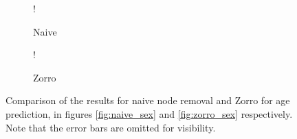 \begin{figure}[H]
    \centering
        \begin{subfigure}{.5\textwidth}
            \centering
            \begin{center}
                \resizebox {1.0\linewidth} {!} {
                    
                }
            \end{center}
            \caption{Naive}
            \label{fig:comparison_age_naive}
        \end{subfigure}%
        \begin{subfigure}{.5\textwidth}
            \centering
            \begin{center}
                \resizebox {1.0\linewidth} {!} {
                    
                }
            \end{center}
            \caption{Zorro}
            \label{fig:comparison_age_zorro}
        \end{subfigure}
    \caption{Comparison of the results for naive node removal and Zorro for age prediction, in figures \ref{fig:naive_sex} and \ref{fig:zorro_sex} respectively. Note that the error bars are omitted for visibility.}
    \label{fig:comparison_age}
\end{figure}